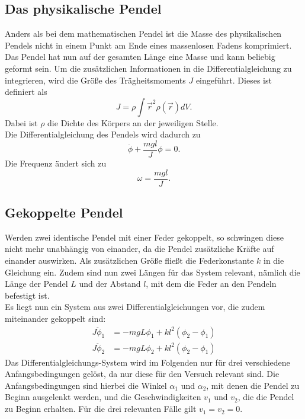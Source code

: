 \subsection{Das physikalische Pendel}
Anders als bei dem mathematischen Pendel ist die Masse des physikalischen Pendels nicht in einem Punkt am Ende eines massenlosen Fadens komprimiert.
Das Pendel hat nun auf der gesamten Länge eine Masse und kann beliebig geformt sein. Um die zusätzlichen Informationen in die Differentialgleichung
zu integrieren, wird die Größe des Trägheitsmoments $J$ eingeführt. Dieses ist definiert als
\begin{equation}
    J=\rho\int{\vec{r}^2\rho(\vec{r})dV}. \label{eqn:traegheit}
\end{equation}
Dabei ist $\rho$ die Dichte des Körpers an der jeweiligen Stelle.
\\
Die Differentialgleichung des Pendels wird dadurch zu
\begin{equation}
    \ddot{\phi}+\frac{mgl}{J}\phi=0.
\end{equation}
Die Frequenz ändert sich zu
\begin{equation}
    \omega=\frac{mgl}{J}.
\end{equation}

\subsection{Gekoppelte Pendel}
Werden zwei identische Pendel mit einer Feder gekoppelt, so schwingen diese nicht mehr unabhängig von einander, da die Pendel zusätzliche Kräfte auf
einander auswirken. Als zusätzlichen Größe fließt die Federkonstante $k$ in die Gleichung ein. Zudem sind nun zwei Längen für das System relevant, nämlich die
Länge der Pendel $L$ und der Abstand $l$, mit dem die Feder an den Pendeln befestigt ist.
\\
Es liegt nun ein System aus zwei Differentialgleichungen vor, die zudem miteinander gekoppelt sind:
\begin{align}
    J\ddot{\phi}_1&=-mgL\phi_1+kl^2(\phi_2-\phi_1)\\
    J\ddot{\phi}_2&=-mgL\phi_2+kl^2(\phi_2-\phi_1)
\end{align}
Das Differentialgleichungs-System wird im Folgenden nur für drei verschiedene Anfangsbedingungen gelöst, da nur diese für den Versuch relevant sind.
Die Anfangsbedingungen sind hierbei die Winkel $\alpha_1$ und $\alpha_2$, mit denen die Pendel zu Beginn ausgelenkt werden, und die Geschwindigkeiten
$v_1$ und $v_2$, die die Pendel zu Beginn erhalten. Für die drei relevanten Fälle gilt $v_1=v_2=0$.

